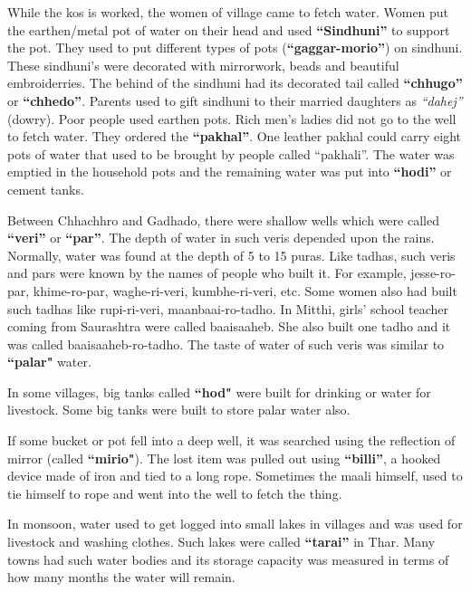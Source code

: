While the kos is worked, the women of village came to fetch water. Women put the
earthen/metal pot of water on their head and used \textbf{``Sindhuni''} to support the pot.
They used to put different types of pots (\textbf{``gaggar-morio''}) on
sindhuni. These sindhuni's were decorated with mirrorwork, beads and beautiful
embroiderries. The behind of the sindhuni had its decorated tail called
\textbf{``chhugo''} or \textbf{``chhedo''}. Parents used to gift sindhuni to
their married daughters as \textit{``dahej''} (dowry). Poor people used earthen pots.
Rich men's ladies did not go to the well to fetch water. They ordered the
\textbf{``pakhal''}. One leather pakhal could carry eight pots of water that
used to be brought by people called ``pakhali''. The water was emptied in the
household pots and the remaining water was put into \textbf{``hodi''} or cement
tanks.

Between Chhachhro and Gadhado, there were shallow wells which were called
\textbf{``veri''} or \textbf{``par''}. The depth of water in such veris depended
upon the rains. Normally, water was found at the depth of 5 to 15 puras. Like
tadhas, such veris and pars were known by the names of people who built it. For
example, jesse-ro-par, khime-ro-par, waghe-ri-veri, kumbhe-ri-veri, etc. Some
women also had built such tadhas like rupi-ri-veri, maanbaai-ro-tadho. In
Mitthi, girls' school teacher coming from Saurashtra were called baaisaaheb. She
also built one tadho and it was called baaisaaheb-ro-tadho. The taste of water
of such veris was similar to \textbf{``palar"} water.

In some villages, big tanks called \textbf{``hod"} were built for drinking or water
for livestock. Some big tanks were built to store palar water also.

If some bucket or pot fell into a deep well, it was searched using the
reflection of mirror (called \textbf{``mirio"}). The lost item was pulled out using
\textbf{``billi''}, a hooked device made of iron and tied to a long rope.
Sometimes the maali himself, used to tie himself to rope and went into the well
to fetch the thing.

In monsoon, water used to get logged into small lakes in villages and was used
for livestock and washing clothes. Such lakes were called \textbf{``tarai''} in
Thar. Many towns had such water bodies and its storage capacity was measured in
terms of how many months the water will remain.

